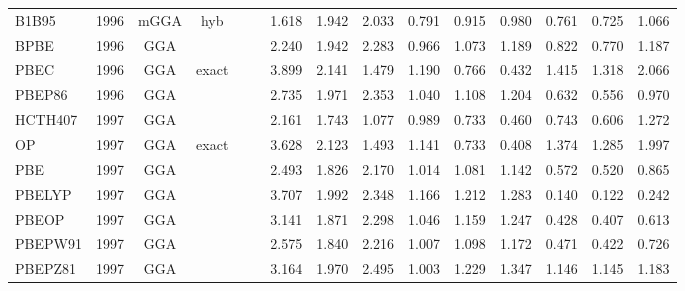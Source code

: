 \begin{landscape}
\begin{longtable}{lcccccrrrrrrrrr}
    B1B95            & 1996 & mGGA & hyb      &             &           & 1.618             & 1.942             & 2.033  & 0.791              & 0.915             & 0.980  & 0.761   & 0.725 & 1.066 \\
    BPBE             & 1996 & GGA  &          &             &           & 2.240             & 1.942             & 2.283  & 0.966              & 1.073             & 1.189  & 0.822   & 0.770 & 1.187 \\
    PBEC             & 1996 & GGA  & exact    &             &           & 3.899             & 2.141             & 1.479  & 1.190              & 0.766             & 0.432  & 1.415   & 1.318 & 2.066 \\
    PBEP86           & 1996 & GGA  &          &             &           & 2.735             & 1.971             & 2.353  & 1.040              & 1.108             & 1.204  & 0.632   & 0.556 & 0.970 \\
    HCTH407          & 1997 & GGA  &          &             &           & 2.161             & 1.743             & 1.077  & 0.989              & 0.733             & 0.460  & 0.743   & 0.606 & 1.272 \\
    OP               & 1997 & GGA  & exact    &             &           & 3.628             & 2.123             & 1.493  & 1.141              & 0.733             & 0.408  & 1.374   & 1.285 & 1.997 \\
    PBE              & 1997 & GGA  &          &             &           & 2.493             & 1.826             & 2.170  & 1.014              & 1.081             & 1.142  & 0.572   & 0.520 & 0.865 \\
    PBELYP           & 1997 & GGA  &          &             &           & 3.707             & 1.992             & 2.348  & 1.166              & 1.212             & 1.283  & 0.140   & 0.122 & 0.242 \\
    PBEOP            & 1997 & GGA  &          &             &           & 3.141             & 1.871             & 2.298  & 1.046              & 1.159             & 1.247  & 0.428   & 0.407 & 0.613 \\
    PBEPW91          & 1997 & GGA  &          &             &           & 2.575             & 1.840             & 2.216  & 1.007              & 1.098             & 1.172  & 0.471   & 0.422 & 0.726 \\
    PBEPZ81          & 1997 & GGA  &          &             &           & 3.164             & 1.970             & 2.495  & 1.003              & 1.229             & 1.347  & 1.146   & 1.145 & 1.183 \\

\end{longtable}
\end{landscape}
